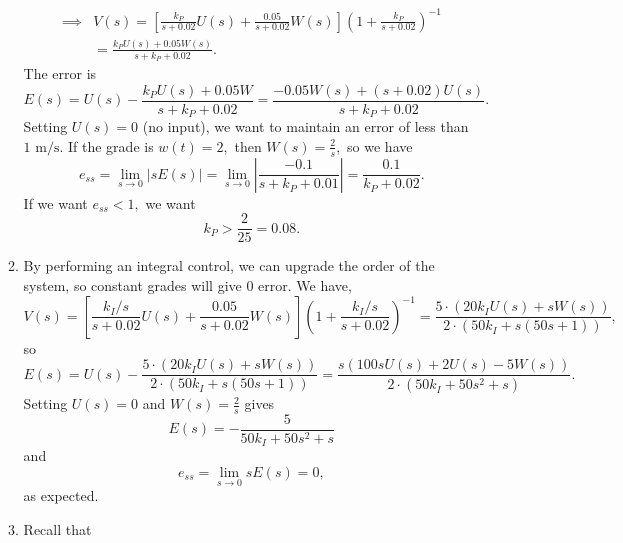 \documentclass{article}
\numberwithin{equation}{section}
\begin{document}
\begin{enumerate}[label=\textbf{2.\arabic*}]
\begin{enumerate}[label=(\alph*)]
\begin{align}
            \implies & V(s) = \left[\frac{k_P}{s+0.02}U(s) + \frac{0.05}{s+0.02}W(s)\right] \left(1 + \frac{k_P}{s+0.02}\right)^{-1} \\ 
            &= \frac{k_{P} U{(s)} + 0.05W(s)}{s + k_{P} + 0.02}.
        \end{align}
        The error is 
        \begin{equation}
            E(s) = U(s) - \frac{k_{P} U{(s)} + 0.05W}{s + k_{P} + 0.02} = \frac{- 0.05 W(s) + (s + 0.02) U{(s)}}{s + k_{P} + 0.02}.
        \end{equation}
        Setting $U(s)=0$ (no input), we want to maintain an error of less than $1\text{ m/s}.$ If the grade is $w(t)=2,$ then $W(s)=\frac{2}{s},$ so we have 
        \begin{equation}
            e_{ss} = \lim_{s\to 0} |s E(s)| = \lim_{s\to 0} \left|\frac{-0.1}{s+k_P+0.01}\right| = \frac{0.1}{k_P+0.02}.
        \end{equation}
        If we want $e_{ss} < 1,$ we want
        \begin{equation}
            k_{P} > \frac{2}{25} = 0.08.
        \end{equation} 
        \item By performing an integral control, we can upgrade the order of the system, so constant grades will give 0 error. We have, 
        \begin{equation}
            V(s) = \left[\frac{k_I/s}{s+0.02}U(s) + \frac{0.05}{s+0.02}W(s)\right] \left(1 + \frac{k_I/s}{s+0.02}\right)^{-1} = \frac{5 \cdot (20 k_I U{(s)} + s W{(s)})}{2 \cdot (50 k_I + s (50 s + 1))},
        \end{equation}
        so 
        \begin{equation}
            E(s) = U(s) - \frac{5 \cdot (20 k_I U{(s)} + s W{(s)})}{2 \cdot (50 k_I + s (50 s + 1))} = \frac{s (100 s U{(s)} + 2 U{(s)} - 5 W{(s)})}{2 \cdot (50 k_I + 50 s^{2} + s)}.
        \end{equation}
        Setting $U(s)=0$ and $W(s) = \frac{2}{s}$ gives 
        \begin{equation}
            E(s) = - \frac{5}{50 k_I + 50 s^{2} + s}
        \end{equation}
        and
        \begin{equation}
            e_{ss} = \lim_{s\to 0} sE(s) = 0,
        \end{equation}
        as expected.
        \item Recall that 
        \begin{equation}

\end{equation}
\end{enumerate}
\end{enumerate}
\end{document}
